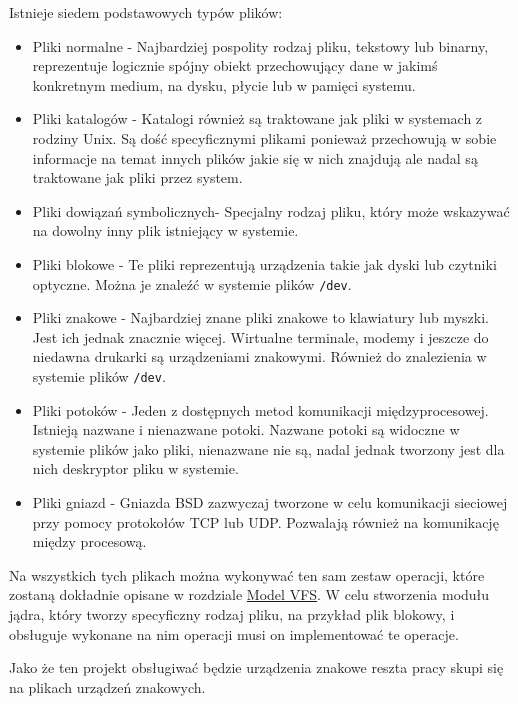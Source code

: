 Istnieje siedem podstawowych typów plików:

\begin{itemize}
\itemsep1pt\parskip0pt
\item
  Pliki normalne - Najbardziej pospolity rodzaj pliku, tekstowy lub
  binarny, reprezentuje logicznie spójny obiekt przechowujący dane w
  jakimś konkretnym medium, na dysku, płycie lub w pamięci systemu.
\item
  Pliki katalogów - Katalogi również są traktowane jak pliki w systemach
  z rodziny Unix. Są dość specyficznymi plikami ponieważ przechowują w
  sobie informacje na temat innych plików jakie się w nich znajdują ale
  nadal są traktowane jak pliki przez system.
\item
  Pliki dowiązań symbolicznych- Specjalny rodzaj pliku, który może
  wskazywać na dowolny inny plik istniejący w systemie.
\item
  Pliki blokowe - Te pliki reprezentują urządzenia takie jak dyski lub
  czytniki optyczne. Można je znaleźć w systemie plików \texttt{/dev}.
\item
  Pliki znakowe - Najbardziej znane pliki znakowe to klawiatury lub
  myszki. Jest ich jednak znacznie więcej. Wirtualne terminale, modemy i
  jeszcze do niedawna drukarki są urządzeniami znakowymi. Również do
  znalezienia w systemie plików \texttt{/dev}.
\item
  Pliki potoków - Jeden z dostępnych metod komunikacji międzyprocesowej.
  Istnieją nazwane i nienazwane potoki. Nazwane potoki są widoczne w
  systemie plików jako pliki, nienazwane nie są, nadal jednak tworzony
  jest dla nich deskryptor pliku w systemie.
\item
  Pliki gniazd - Gniazda BSD zazwyczaj tworzone w celu komunikacji
  sieciowej przy pomocy protokołów TCP lub UDP. Pozwalają również na
  komunikację między procesową.
\end{itemize}

Na wszystkich tych plikach można wykonywać ten sam zestaw operacji,
które zostaną dokładnie opisane w rozdziale \hyperref[model-vfs]{Model
VFS}. W celu stworzenia modułu jądra, który tworzy specyficzny rodzaj
pliku, na przykład plik blokowy, i obsługuje wykonane na nim operacji
musi on implementować te operacje.

Jako że ten projekt obsługiwać będzie urządzenia znakowe reszta pracy
skupi się na plikach urządzeń znakowych.


